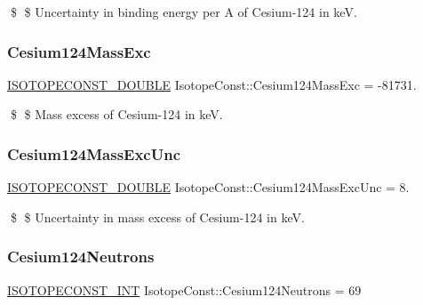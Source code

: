 \$ \$ Uncertainty in binding energy per A of Cesium-\/124 in keV. \mbox{\label{group___isotope_const-_cesium-_cs124_gaf7f139ce415b6469ac472d0d3a3a384d}} 
\subsubsection{\texorpdfstring{Cesium124\+Mass\+Exc}{Cesium124MassExc}}
{\footnotesize\ttfamily \mbox{\hyperlink{group___isotope_const-_macros_ga8f45a7272ce02c0b4c65c44636ed719a}{I\+S\+O\+T\+O\+P\+E\+C\+O\+N\+S\+T\+\_\+\+D\+O\+U\+B\+LE}} Isotope\+Const\+::\+Cesium124\+Mass\+Exc = -\/81731.}

\$ \$ Mass excess of Cesium-\/124 in keV. \mbox{\label{group___isotope_const-_cesium-_cs124_gaa350fc58db21ce9880a992a200198fd1}} 
\subsubsection{\texorpdfstring{Cesium124\+Mass\+Exc\+Unc}{Cesium124MassExcUnc}}
{\footnotesize\ttfamily \mbox{\hyperlink{group___isotope_const-_macros_ga8f45a7272ce02c0b4c65c44636ed719a}{I\+S\+O\+T\+O\+P\+E\+C\+O\+N\+S\+T\+\_\+\+D\+O\+U\+B\+LE}} Isotope\+Const\+::\+Cesium124\+Mass\+Exc\+Unc = 8.}

\$ \$ Uncertainty in mass excess of Cesium-\/124 in keV. \mbox{\label{group___isotope_const-_cesium-_cs124_ga4bccca35dce24e31f879b4168ffff108}} 
\subsubsection{\texorpdfstring{Cesium124\+Neutrons}{Cesium124Neutrons}}
{\footnotesize\ttfamily \mbox{\hyperlink{group___isotope_const-_macros_ga5f18360b3e99483a35c32d789e62621c}{I\+S\+O\+T\+O\+P\+E\+C\+O\+N\+S\+T\+\_\+\+I\+NT}} Isotope\+Const\+::\+Cesium124\+Neutrons = 69}

